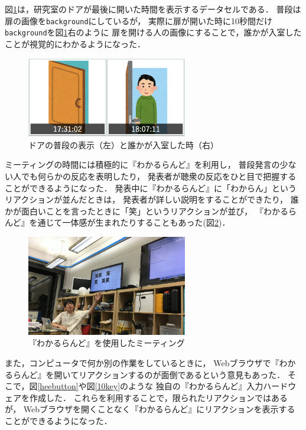図\ref{door}は，研究室のドアが最後に開いた時間を表示するデータセルである．
普段は扉の画像を\texttt{background}にしているが，
実際に扉が開いた時に10秒間だけ\texttt{background}を図\ref{door}右のように
扉を開ける人の画像にすることで，誰かが入室したことが視覚的にわかるようになった．

\begin{figure}[h]
\centering
\includegraphics[width=7cm]{images/door.png}
\caption{ドアの普段の表示（左）と誰かが入室した時（右）}
\label{door}
\end{figure}

ミーティングの時間には積極的に『わかるらんど』を利用し，
普段発言の少ない人でも何らかの反応を表明したり，
発表者が聴衆の反応をひと目で把握することができるようになった．
発表中に『わかるらんど』に「わからん」というリアクションが並んだときは，
発表者が詳しい説明をすることができたり，
誰かが面白いことを言ったときに「笑」というリアクションが並び，
『わかるらんど』を通じて一体感が生まれたりすることもあった(図\ref{wara})．

\begin{figure}[h]
\centering
\includegraphics[width=7cm]{images/wara.png}
\caption{『わかるらんど』を使用したミーティング}
\label{wara}
\end{figure}

また，コンピュータで何か別の作業をしているときに，
Webブラウザで『わかるらんど』を開いてリアクションするのが面倒であるという意見もあった．
そこで，図\ref{heebutton}や図\ref{10key}のような
独自の『わかるらんど』入力ハードウェアを作成した．
これらを利用することで，限られたリアクションではあるが，
Webブラウザを開くことなく『わかるらんど』にリアクションを表示することができるようになった．

